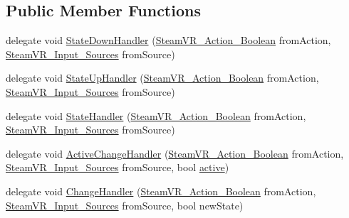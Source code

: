 \subsection*{Public Member Functions}
\begin{DoxyCompactItemize}
\item 
delegate void \mbox{\hyperlink{class_valve_1_1_v_r_1_1_steam_v_r___action___boolean_a529f46e4f0459edb2641bbb382d10614}{State\+Down\+Handler}} (\mbox{\hyperlink{class_valve_1_1_v_r_1_1_steam_v_r___action___boolean}{Steam\+V\+R\+\_\+\+Action\+\_\+\+Boolean}} from\+Action, \mbox{\hyperlink{namespace_valve_1_1_v_r_a82e5bf501cc3aa155444ee3f0662853f}{Steam\+V\+R\+\_\+\+Input\+\_\+\+Sources}} from\+Source)
\item 
delegate void \mbox{\hyperlink{class_valve_1_1_v_r_1_1_steam_v_r___action___boolean_a87ebada25dac6016557c3b81e6324b90}{State\+Up\+Handler}} (\mbox{\hyperlink{class_valve_1_1_v_r_1_1_steam_v_r___action___boolean}{Steam\+V\+R\+\_\+\+Action\+\_\+\+Boolean}} from\+Action, \mbox{\hyperlink{namespace_valve_1_1_v_r_a82e5bf501cc3aa155444ee3f0662853f}{Steam\+V\+R\+\_\+\+Input\+\_\+\+Sources}} from\+Source)
\item 
delegate void \mbox{\hyperlink{class_valve_1_1_v_r_1_1_steam_v_r___action___boolean_a59bb3ba4454fcebc2f1d2ddd661dd38f}{State\+Handler}} (\mbox{\hyperlink{class_valve_1_1_v_r_1_1_steam_v_r___action___boolean}{Steam\+V\+R\+\_\+\+Action\+\_\+\+Boolean}} from\+Action, \mbox{\hyperlink{namespace_valve_1_1_v_r_a82e5bf501cc3aa155444ee3f0662853f}{Steam\+V\+R\+\_\+\+Input\+\_\+\+Sources}} from\+Source)
\item 
delegate void \mbox{\hyperlink{class_valve_1_1_v_r_1_1_steam_v_r___action___boolean_af9f3044d5e4868485945b70d907c6bbb}{Active\+Change\+Handler}} (\mbox{\hyperlink{class_valve_1_1_v_r_1_1_steam_v_r___action___boolean}{Steam\+V\+R\+\_\+\+Action\+\_\+\+Boolean}} from\+Action, \mbox{\hyperlink{namespace_valve_1_1_v_r_a82e5bf501cc3aa155444ee3f0662853f}{Steam\+V\+R\+\_\+\+Input\+\_\+\+Sources}} from\+Source, bool \mbox{\hyperlink{interface_valve_1_1_v_r_1_1_i_steam_v_r___action___source_a529749f5fa62c29a4faac767cd9ece8d}{active}})
\item 
delegate void \mbox{\hyperlink{class_valve_1_1_v_r_1_1_steam_v_r___action___boolean_a9dbdff089d05d822688005fa19fef120}{Change\+Handler}} (\mbox{\hyperlink{class_valve_1_1_v_r_1_1_steam_v_r___action___boolean}{Steam\+V\+R\+\_\+\+Action\+\_\+\+Boolean}} from\+Action, \mbox{\hyperlink{namespace_valve_1_1_v_r_a82e5bf501cc3aa155444ee3f0662853f}{Steam\+V\+R\+\_\+\+Input\+\_\+\+Sources}} from\+Source, bool new\+State)

\end{DoxyCompactItemize}
